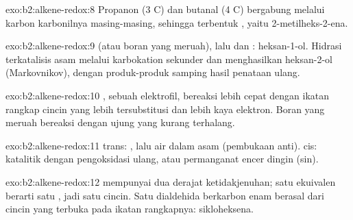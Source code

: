 \begin{solution}{exo:b2:alkene-redox:8}
Propanon (3 C) dan butanal (4 C) bergabung melalui karbon karbonilnya
masing-masing, sehingga terbentuk , yaitu
2-metilheks-2-ena.
\end{solution}

\begin{solution}{exo:b2:alkene-redox:9}
 (atau boran yang meruah), lalu  dan : heksan-1-ol.
Hidrasi terkatalisis asam melalui karbokation sekunder dan menghasilkan
heksan-2-ol (Markovnikov), dengan produk-produk samping hasil penataan ulang.
\end{solution}

\begin{solution}{exo:b2:alkene-redox:10}
, sebuah elektrofil, bereaksi lebih cepat dengan ikatan rangkap
cincin yang lebih tersubstitusi dan lebih kaya elektron. Boran yang meruah
bereaksi dengan  ujung yang kurang terhalang.
\end{solution}

\begin{solution}{exo:b2:alkene-redox:11}
trans: , lalu air dalam asam (pembukaan anti). cis: 
katalitik dengan pengoksidasi ulang, atau permanganat encer dingin (sin).
\end{solution}

\begin{solution}{exo:b2:alkene-redox:12}
 mempunyai dua derajat ketidakjenuhan; satu ekuivalen 
berarti satu , jadi satu cincin. Satu dialdehida berkarbon enam
berasal dari cincin yang terbuka pada ikatan rangkapnya: sikloheksena.
\end{solution}

